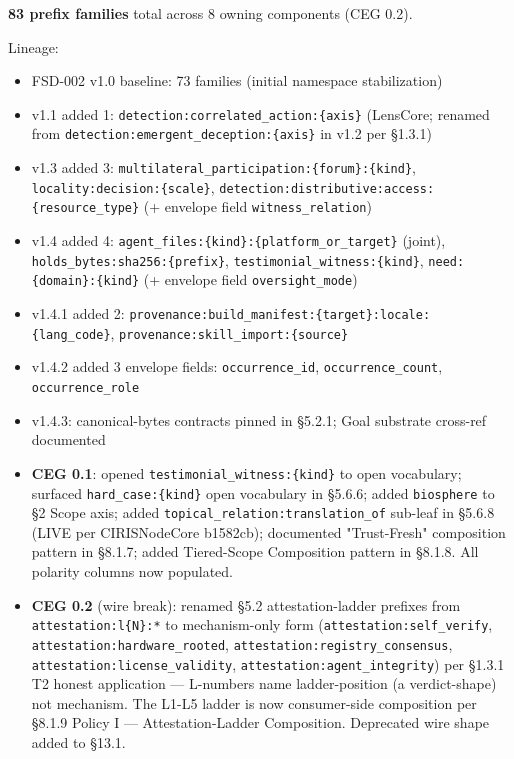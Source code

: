 \documentclass[11pt]{article}
\begin{document}
\textbf{83 prefix families} total across 8 owning components (CEG 0.2).


Lineage:

\begin{itemize}\setlength\itemsep{0pt}
\item FSD-002 v1.0 baseline: 73 families (initial namespace stabilization)
\item v1.1 added 1: \texttt{detection:correlated\_action:\{axis\}} (LensCore; renamed from \texttt{detection:emergent\_deception:\{axis\}} in v1.2 per §1.3.1)
\item v1.3 added 3: \texttt{multilateral\_participation:\{forum\}:\{kind\}}, \texttt{locality:decision:\{scale\}}, \texttt{detection:distributive:access:\{resource\_type\}} (+ envelope field \texttt{witness\_relation})
\item v1.4 added 4: \texttt{agent\_files:\{kind\}:\{platform\_or\_target\}} (joint), \texttt{holds\_bytes:sha256:\{prefix\}}, \texttt{testimonial\_witness:\{kind\}}, \texttt{need:\{domain\}:\{kind\}} (+ envelope field \texttt{oversight\_mode})
\item v1.4.1 added 2: \texttt{provenance:build\_manifest:\{target\}:locale:\{lang\_code\}}, \texttt{provenance:skill\_import:\{source\}}
\item v1.4.2 added 3 envelope fields: \texttt{occurrence\_id}, \texttt{occurrence\_count}, \texttt{occurrence\_role}
\item v1.4.3: canonical-bytes contracts pinned in §5.2.1; Goal substrate cross-ref documented
\item \textbf{CEG 0.1}: opened \texttt{testimonial\_witness:\{kind\}} to open vocabulary; surfaced \texttt{hard\_case:\{kind\}} open vocabulary in §5.6.6; added \texttt{biosphere} to §2 Scope axis; added \texttt{topical\_relation:translation\_of} sub-leaf in §5.6.8 (LIVE per CIRISNodeCore b1582cb); documented "Trust-Fresh" composition pattern in §8.1.7; added Tiered-Scope Composition pattern in §8.1.8. All polarity columns now populated.
\item \textbf{CEG 0.2} (wire break): renamed §5.2 attestation-ladder prefixes from \texttt{attestation:l\{N\}:*} to mechanism-only form (\texttt{attestation:self\_verify}, \texttt{attestation:hardware\_rooted}, \texttt{attestation:registry\_consensus}, \texttt{attestation:license\_validity}, \texttt{attestation:agent\_integrity}) per §1.3.1 T2 honest application — L-numbers name ladder-position (a verdict-shape) not mechanism. The L1-L5 ladder is now consumer-side composition per §8.1.9 Policy I — Attestation-Ladder Composition. Deprecated wire shape added to §13.1.

\end{itemize}
\end{document}
